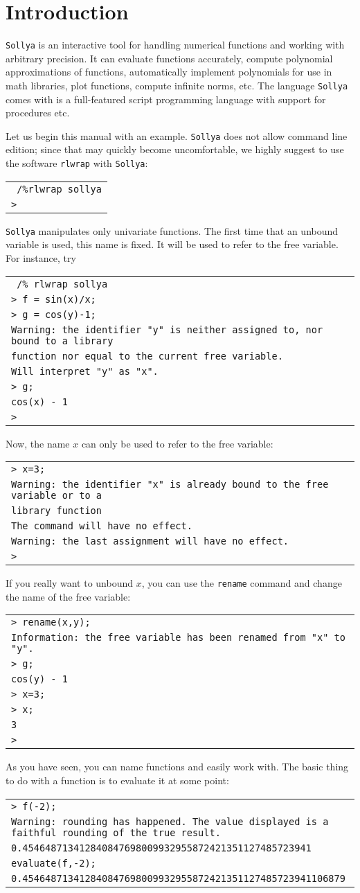 \documentclass[a4paper]{article}
\newcommand{\com}[1]{\texttt{#1}}
\newcommand{\sollya}{\texttt{Sollya}\xspace}
\newcommand{\rlwrap}{\texttt{rlwrap}\xspace}
\newcommand{\code}[1]{
\begin{center}
\begin{tabular}{|p{14.8cm}|}
\hline
#1
\hline
\end{tabular}
\end{center}
}
\newcommand{\ligne}[1]{\texttt{#1}\\}
\begin{document}
\section{Introduction}
\sollya is an interactive tool for handling numerical functions and working with arbitrary precision. It can evaluate functions accurately, compute polynomial approximations of functions, automatically implement polynomials for use in math libraries, plot functions, compute infinite norms, etc. The language \sollya comes with is a full-featured script programming language with support for procedures etc. 

Let us begin this manual with an example. \sollya does not allow command line edition; since that may quickly become uncomfortable, we highly suggest to use the software \rlwrap with \sollya:

\code{
\ligne{~/\%rlwrap sollya}
\ligne{>}
}

\sollya manipulates only univariate functions. The first time that an unbound variable is used, this name is fixed. It will be used to refer to the free variable. For instance, try

\code{
\ligne{~/\% rlwrap sollya}
\ligne{> f = sin(x)/x;}
\ligne{> g = cos(y)-1;}
\ligne{Warning: the identifier "y" is neither assigned to, nor bound to a library }
\ligne{function nor equal to the current free variable.}
\ligne{Will interpret "y" as "x".}
\ligne{> g;}
\ligne{cos(x) - 1}
\ligne{>} 
}

Now, the name $x$ can only be used to refer to the free variable:

\code{
\ligne{> x=3;}
\ligne{Warning: the identifier "x" is already bound to the free variable or to a }
\ligne{library function}
\ligne{The command will have no effect.}
\ligne{Warning: the last assignment will have no effect.}
\ligne{>}
}

If you really want to unbound $x$, you can use the \com{rename} command and change the name of the free variable:

\code{
\ligne{> rename(x,y);}
\ligne{Information: the free variable has been renamed from "x" to "y".}
\ligne{> g;}
\ligne{cos(y) - 1}
\ligne{> x=3;}
\ligne{> x;}
\ligne{3}
\ligne{> }
}

As you have seen, you can name functions and easily work with. The basic thing to do with a function is to evaluate it at some point:

\code{
\ligne{> f(-2);}
\ligne{Warning: rounding has happened. The value displayed is a faithful rounding of the true result.}
\ligne{0.454648713412840847698009932955872421351127485723941}
\ligne{evaluate(f,-2);}
\ligne{0.454648713412840847698009932955872421351127485723941106879}
}
\end{document}
